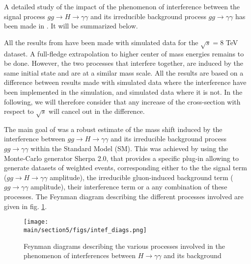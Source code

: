 A detailed study of the impact of the phenomenon of interference between the signal process $gg \rightarrow H \rightarrow \gamma\gamma$ and its irreducible background process $gg \rightarrow \gamma\gamma$ has been made in \cite{ATL-PHYS-PUB-2016-009}. It will be summarized below.

All the results from \cite{ATL-PHYS-PUB-2016-009} have been made with simulated data for the $\sqrt{s} = 8$ TeV dataset. A full-fledge extrapolation to higher center of mass energies remains to be done. However, the two processes that interfere together, are induced by the same initial state and are at a similar mass scale. All the results are based on a difference between results made with simulated data where the interference have been implemented in the simulation, and simulated data where it is not. In the following, we will therefore consider that any increase of the cross-section with respect to $\sqrt{s}$ will cancel out in the difference.

The main goal of \cite{ATL-PHYS-PUB-2016-009} was a robust estimate of the mass shift induced by the interference between $gg \rightarrow H \rightarrow \gamma\gamma$ and its irreducible background process $gg \rightarrow \gamma\gamma$ within the Standard Model (SM). This was achieved by using the Monte-Carlo generator Sherpa 2.0, that provides a specific plug-in allowing to generate datasets of weighted events, corresponding either to the the signal term ($gg \rightarrow H \rightarrow \gamma\gamma$ amplitude), the irreducible gluon-induced background term ($gg \rightarrow \gamma\gamma$ amplitude), their interference term or a any combination of these processes. The Feynman diagram describing the different processes involved are given in fig. \ref{fig:intef_diags}. 

\begin{figure}
    \centering
    \texttt{[image: \\main/section5/figs/intef\_diags.png]}
    \caption{Feynman diagrams describing the various processes involved in the phenomenon of interferences between $H\rightarrow\gamma\gamma$ and its background}
    \label{fig:intef_diags}
\end{figure}

